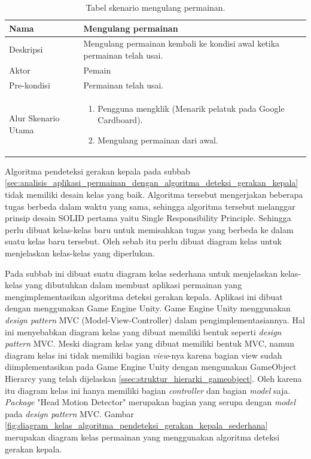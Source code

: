 \begin{table}[]
    \centering
    \begin{tabular}{|p{3cm}|p{10cm}|}
    \hline
        Nama & Mengulang permainan\\
    \hline
    \hline
        Deskripsi & Mengulang permainan kembali ke kondisi awal ketika permainan telah usai.\\
    \hline
        Aktor & Pemain \\
    \hline
        Pre-kondisi & Permainan telah usai. \\
    \hline
        Alur Skenario Utama & 
        \begin{enumerate}
            \item Pengguna mengklik (Menarik pelatuk pada Google Cardboard).
            \item Mengulang permainan dari awal.
        \end{enumerate}\\
    \hline
    \end{tabular}
    \caption{Tabel skenario mengulang permainan.}
    \label{tab:tabel_skenario_mengulang_permainan}
\end{table}

Algoritma pendeteksi gerakan kepala pada subbab \ref{sec:analisis_aplikasi_permainan_dengan_algoritma_deteksi_gerakan_kepala} tidak memiliki desain kelas yang baik. Algoritma tersebut mengerjakan beberapa tugas berbeda dalam waktu yang sama, sehingga algoritma tersebut melanggar prinsip desain SOLID pertama yaitu Single Responsibility Principle. Sehingga perlu dibuat kelas-kelas baru untuk memisahkan tugas yang berbeda ke dalam suatu kelas baru tersebut. Oleh sebab itu perlu dibuat diagram kelas untuk menjelaskan kelas-kelas yang diperlukan. 

Pada subbab ini dibuat suatu diagram kelas sederhana untuk menjelaskan kelas-kelas yang dibutuhkan dalam membuat aplikasi permainan yang mengimplementasikan algoritma deteksi gerakan kepala. Aplikasi ini dibuat dengan menggunakan Game Engine Unity. Game Engine Unity menggunakan \textit{design pattern} MVC (Model-View-Controller) dalam pengimplementasiannya. Hal ini menyebabkan diagram kelas yang dibuat memiliki bentuk seperti \textit{design pattern} MVC. Meski diagram kelas yang dibuat memiliki bentuk MVC, namun diagram kelas ini tidak memiliki bagian \textit{view}-nya karena bagian view sudah diimplementasikan pada Game Engine Unity dengan mengunakan GameObject Hierarcy yang telah dijelaskan \ref{ssec:struktur_hierarki_gameobject}. Oleh karena itu diagram kelas ini hanya memiliki bagian \textit{controller} dan bagian \textit{model} saja. \textit{Package} "Head Motion Detector" merupakan bagian yang serupa dengan \textit{model} pada \textit{design pattern} MVC. Gambar \ref{fig:diagram_kelas_algoritma_pendeteksi_gerakan_kepala_sederhana} merupakan diagram kelas permainan yang menggunakan algoritma deteksi gerakan kepala.


